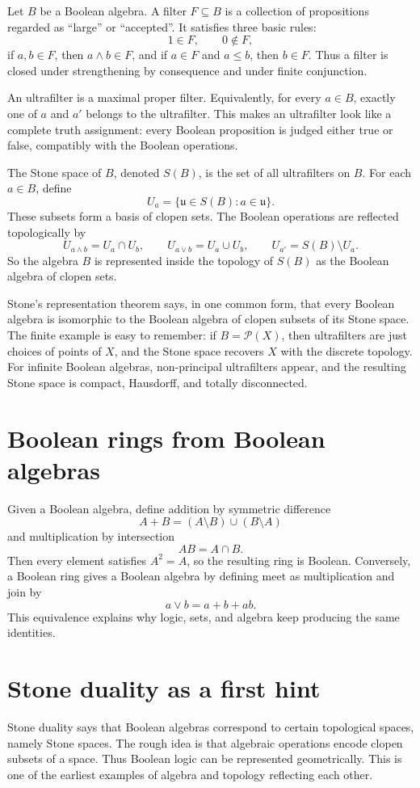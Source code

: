 Let \(B\) be a Boolean algebra.  A filter \(F\subseteq B\) is a collection of propositions regarded as ``large'' or ``accepted''.  It satisfies three basic rules:
\[
  1\in F,\qquad 0\notin F,
\]
if \(a,b\in F\), then \(a\wedge b\in F\), and if \(a\in F\) and \(a\le b\), then \(b\in F\).  Thus a filter is closed under strengthening by consequence and under finite conjunction.

An ultrafilter is a maximal proper filter.  Equivalently, for every \(a\in B\), exactly one of \(a\) and \(a'\) belongs to the ultrafilter.  This makes an ultrafilter look like a complete truth assignment: every Boolean proposition is judged either true or false, compatibly with the Boolean operations.

The Stone space of \(B\), denoted \(S(B)\), is the set of all ultrafilters on \(B\).  For each \(a\in B\), define
\[
  U_a=\{\mathfrak u\in S(B):a\in\mathfrak u\}.
\]
These subsets form a basis of clopen sets.  The Boolean operations are reflected topologically by
\[
  U_{a\wedge b}=U_a\cap U_b,
  \qquad
  U_{a\vee b}=U_a\cup U_b,
  \qquad
  U_{a'}=S(B)\setminus U_a.
\]
So the algebra \(B\) is represented inside the topology of \(S(B)\) as the Boolean algebra of clopen sets.

Stone's representation theorem says, in one common form, that every Boolean algebra is isomorphic to the Boolean algebra of clopen subsets of its Stone space.  The finite example is easy to remember: if \(B=\mathcal P(X)\), then ultrafilters are just choices of points of \(X\), and the Stone space recovers \(X\) with the discrete topology.  For infinite Boolean algebras, non-principal ultrafilters appear, and the resulting Stone space is compact, Hausdorff, and totally disconnected.


\section{Boolean rings from Boolean algebras}

Given a Boolean algebra, define addition by symmetric difference
\[
  A+B=(A\setminus B)\cup(B\setminus A)
\]
and multiplication by intersection
\[
  AB=A\cap B.
\]
Then every element satisfies \(A^2=A\), so the resulting ring is Boolean.  Conversely, a Boolean ring gives a Boolean algebra by defining meet as multiplication and join by
\[
  a\vee b=a+b+ab.
\]
This equivalence explains why logic, sets, and algebra keep producing the same identities.

\section{Stone duality as a first hint}

Stone duality says that Boolean algebras correspond to certain topological spaces, namely Stone spaces.  The rough idea is that algebraic operations encode clopen subsets of a space.  Thus Boolean logic can be represented geometrically.  This is one of the earliest examples of algebra and topology reflecting each other.
